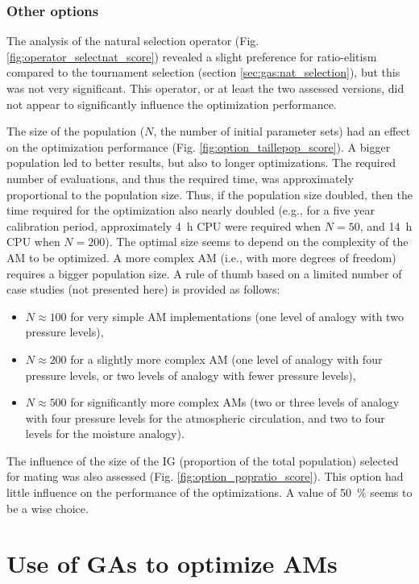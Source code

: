 \documentclass{ametsoc}
\begin{document}
\subsubsection{Other options}

The analysis of the natural selection operator (Fig. \ref{fig:operator_selectnat_score}) revealed a slight preference for ratio-elitism compared to the tournament selection (section \ref{sec:gas:nat_selection}), but this was not very significant. This operator, or at least the two assessed versions, did not appear to significantly influence the optimization performance.

The size of the population ($N$, the number of initial parameter sets) had an effect on the optimization performance (Fig. \ref{fig:option_taillepop_score}). A bigger population led to better results, but also to longer optimizations. The required number of evaluations, and thus the required time, was approximately proportional to the population size. Thus, if the population size doubled, then the time required for the optimization also nearly doubled (e.g., for a five year calibration period, approximately 4~h CPU were required when $N = 50$, and 14~h CPU when $N = 200$). The optimal size seems to depend on the complexity of the AM to be optimized. A more complex AM (i.e., with more degrees of freedom) requires a bigger population size. A rule of thumb based on a limited number of case studies (not presented here) is provided as follows:

\begin{itemize}
	\item $N\approx100$ for very simple AM implementations (one level of analogy with two pressure levels),
	\item $N\approx200$ for a slightly more complex AM (one level of analogy with four pressure levels, or two levels of analogy with fewer pressure levels),
	\item $N\approx500$ for significantly more complex AMs (two or three levels of analogy with four pressure levels for the atmospheric circulation, and two to four levels for the moisture analogy).
\end{itemize}

The influence of the size of the IG (proportion of the total population) selected for mating was also assessed (Fig. \ref{fig:option_popratio_score}). This option had little influence on the performance of the optimizations. A value of 50~\% seems to be a wise choice.


\section{Use of GAs to optimize AMs}
\label{sec:use}
\end{document}
